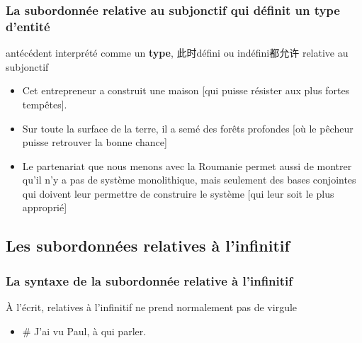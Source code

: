 \documentclass[UTF8]{report}
\begin{document}
\subsubsection{La subordonnée relative au subjonctif qui définit un type d’entité}
antécédent interprété comme un \textbf{type}, 此时défini ou indéfini都允许 relative au subjonctif
\begin{itemize}
    \item Cet entrepreneur a construit une maison [qui puisse résister aux plus fortes tempêtes].
    \item Sur toute la surface de la terre, il a semé des forêts profondes [où le pêcheur puisse retrouver la bonne chance]
    \item Le partenariat que nous menons avec la Roumanie permet aussi de montrer qu’il n’y a pas de système monolithique, mais seulement des bases conjointes qui doivent leur permettre de construire le système [qui leur soit le plus approprié]
\end{itemize}


\subsection{Les subordonnées relatives à l’infinitif}
\subsubsection{La syntaxe de la subordonnée relative à l’infinitif}
À l’écrit, relatives à l’infinitif ne prend normalement pas de virgule
\begin{itemize}
    \item \# J’ai vu Paul, à qui parler.
\end{itemize}
\end{document}
